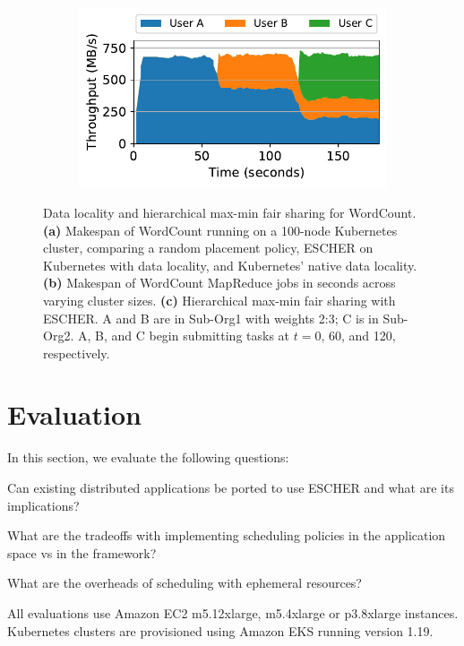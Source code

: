 \begin{figure}[t]
\begin{subfigure}[b]{0.30\textwidth}
 \includegraphics[width=\textwidth]{escher/plots/hfs/3user_hfs_sharing_mapreduce_50nodes_area_short.pdf}
 \caption{}
 \label{fig:hfs-3user-result}
\end{subfigure}
\vspace{-2em}
\caption{\small 
Data locality and hierarchical max-min fair sharing for WordCount.
\textbf{(a)} Makespan of WordCount running on a 100-node Kubernetes cluster, comparing a random placement policy, ESCHER on Kubernetes with data locality, and Kubernetes' native data locality.
\textbf{(b)} Makespan of WordCount MapReduce jobs in seconds across varying cluster sizes.
\textbf{(c)} Hierarchical max-min fair sharing with ESCHER.
A and B are in Sub-Org1 with weights 2:3; C is in Sub-Org2.
A, B, and C begin submitting tasks at $t=$0, 60, and 120, respectively.
}
\vspace{-3mm}
\end{figure}


\section{Evaluation}
\label{sec:eval}

In this section, we evaluate the following questions:
\begin{compactitem}
    \item Can existing distributed applications be ported to use ESCHER and what are its implications?
    \item What are the tradeoffs with implementing scheduling policies in the application space vs in the framework?
    \item What are the overheads of scheduling with ephemeral resources?
\end{compactitem}

All evaluations use Amazon EC2 m5.12xlarge, m5.4xlarge or p3.8xlarge instances. Kubernetes clusters are provisioned using Amazon EKS running version 1.19.

